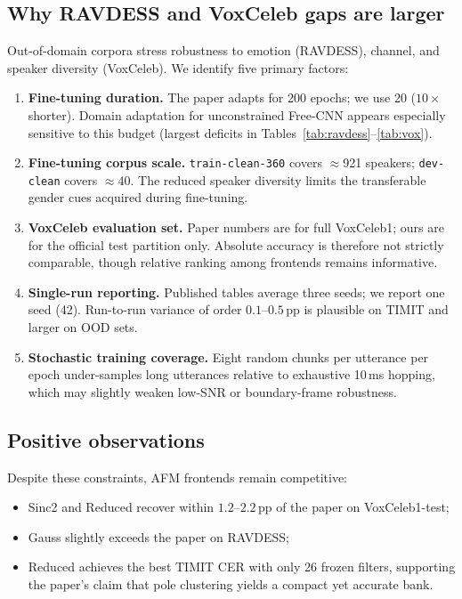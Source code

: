 \documentclass[11pt,a4paper]{article}
\begin{document}
\subsection{Why RAVDESS and VoxCeleb gaps are larger}

Out-of-domain corpora stress robustness to emotion (RAVDESS), channel, and speaker diversity (VoxCeleb). We identify five primary factors:

\begin{enumerate}[leftmargin=1.6em,itemsep=0.4em]
  \item \textbf{Fine-tuning duration.} The paper adapts for 200 epochs; we use 20 ($10\times$ shorter). Domain adaptation for unconstrained Free-CNN appears especially sensitive to this budget (largest deficits in Tables~\ref{tab:ravdess}--\ref{tab:vox}).
  \item \textbf{Fine-tuning corpus scale.} \texttt{train-clean-360} covers $\approx$921 speakers; \texttt{dev-clean} covers $\approx$40. The reduced speaker diversity limits the transferable gender cues acquired during fine-tuning.
  \item \textbf{VoxCeleb evaluation set.} Paper numbers are for full VoxCeleb1; ours are for the official test partition only. Absolute accuracy is therefore not strictly comparable, though relative ranking among frontends remains informative.
  \item \textbf{Single-run reporting.} Published tables average three seeds; we report one seed (42). Run-to-run variance of order $0.1$--$0.5$\,pp is plausible on TIMIT and larger on OOD sets.
  \item \textbf{Stochastic training coverage.} Eight random chunks per utterance per epoch under-samples long utterances relative to exhaustive 10\,ms hopping, which may slightly weaken low-SNR or boundary-frame robustness.
\end{enumerate}

\subsection{Positive observations}

Despite these constraints, AFM frontends remain competitive:
\begin{itemize}[leftmargin=1.6em,itemsep=0.25em]
  \item Sinc2 and Reduced recover within $1.2$--$2.2$\,pp of the paper on VoxCeleb1-test;
  \item Gauss slightly exceeds the paper on RAVDESS;
  \item Reduced achieves the best TIMIT CER with only 26 frozen filters, supporting the paper's claim that pole clustering yields a compact yet accurate bank.
\end{itemize}
\end{document}
